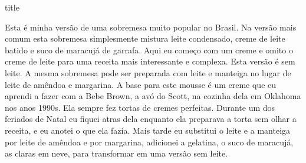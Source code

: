 \documentclass [11pt, letterpaper] {article}
\begin{document}
 {title}

Esta \'e minha vers\~ao de uma sobremesa muito popular no Brasil. Na vers\~ao mais comum esta sobremesa simplesmente mistura leite condensado, creme de leite batido e suco de maracuj\'a de garrafa. Aqui eu come\c{c}o com um creme e omito o creme de leite para uma receita mais interessante e complexa. Esta vers\~ao \'e sem leite. A mesma sobremesa pode ser preparada com leite e manteiga no lugar de leite de am\^endoa e margarina. A base para este mousse \'e um creme que eu aprendi a fazer com a Bebe Brown, a av\'o do Scott, na cozinha dela em Oklahoma nos anos 1990s. Ela sempre fez tortas de cremes perfeitas. Durante um dos feriados de Natal eu fiquei atras dela enquanto ela preparava a torta sem olhar a receita, e eu anotei o que ela fazia. Mais tarde eu substitui o leite e a manteiga por leite de am\^endoa e por margarina, adicionei a gelatina, o suco de maracuj\'a, as claras em neve, para transformar em uma vers\~ao sem leite.
\end{document}
